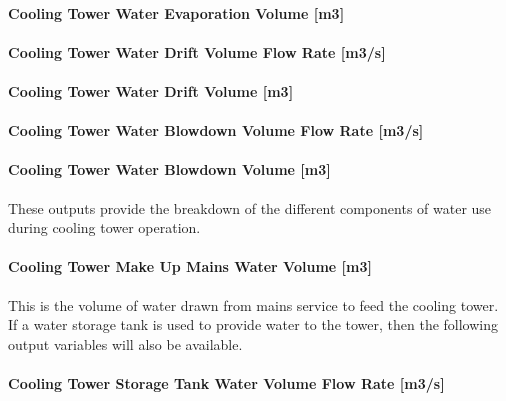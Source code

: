 \paragraph{Cooling Tower Water Evaporation Volume {[}m3{]}}\label{cooling-tower-water-evaporation-volume-m3-2}

\paragraph{Cooling Tower Water Drift Volume Flow Rate {[}m3/s{]}}\label{cooling-tower-water-drift-volume-flow-rate-m3s-2}

\paragraph{Cooling Tower Water Drift Volume {[}m3{]}}\label{cooling-tower-water-drift-volume-m3-2}

\paragraph{Cooling Tower Water Blowdown Volume Flow Rate {[}m3/s{]}}\label{cooling-tower-water-blowdown-volume-flow-rate-m3s-2}

\paragraph{Cooling Tower Water Blowdown Volume {[}m3{]}}\label{cooling-tower-water-blowdown-volume-m3-2}

These outputs provide the breakdown of the different components of water use during cooling tower operation.

\paragraph{Cooling Tower Make Up Mains Water Volume {[}m3{]}}\label{cooling-tower-make-up-mains-water-volume-m3-2}

This is the volume of water drawn from mains service to feed the cooling tower. If a water storage tank is used to provide water to the tower, then the following output variables will also be available.

\paragraph{Cooling Tower Storage Tank Water Volume Flow Rate {[}m3/s{]}}\label{cooling-tower-storage-tank-water-volume-flow-rate-m3s-2}

